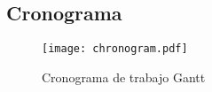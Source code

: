 \begin{landscape}
\subsection{Cronograma}
\centering
	\begin{figure}
        \caption{Cronograma de trabajo Gantt} \label{fig:chronogram}
		\texttt{[image: chronogram.pdf]}
	\end{figure}
\end{landscape}

